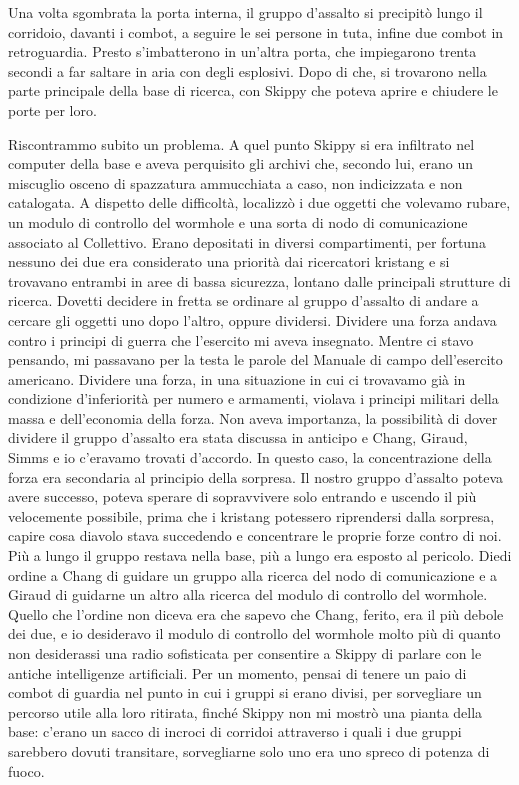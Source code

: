 Una volta sgombrata la porta interna, il gruppo d'assalto si precipitò
lungo il corridoio, davanti i combot, a seguire le sei persone in tuta,
infine due combot in retroguardia. Presto s'imbatterono in un'altra
porta, che impiegarono trenta secondi a far saltare in aria con degli
esplosivi. Dopo di che, si trovarono nella parte principale della base
di ricerca, con Skippy che poteva aprire e chiudere le porte per loro.

Riscontrammo subito un problema. A quel punto Skippy si era infiltrato
nel computer della base e aveva perquisito gli archivi che, secondo lui,
erano un miscuglio osceno di spazzatura ammucchiata a caso, non
indicizzata e non catalogata. A dispetto delle difficoltà, localizzò i
due oggetti che volevamo rubare, un modulo di controllo del wormhole e
una sorta di nodo di comunicazione associato al Collettivo. Erano
depositati in diversi compartimenti, per fortuna nessuno dei due era
considerato una priorità dai ricercatori kristang e si trovavano
entrambi in aree di bassa sicurezza, lontano dalle principali strutture
di ricerca. Dovetti decidere in fretta se ordinare al gruppo d'assalto
di andare a cercare gli oggetti uno dopo l'altro, oppure dividersi.
Dividere una forza andava contro i principi di guerra che l'esercito mi
aveva insegnato. Mentre ci stavo pensando, mi passavano per la testa le
parole del Manuale di campo dell'esercito americano. Dividere una forza,
in una situazione in cui ci trovavamo già in condizione d'inferiorità
per numero e armamenti, violava i principi militari della massa e
dell'economia della forza. Non aveva importanza, la possibilità di dover
dividere il gruppo d'assalto era stata discussa in anticipo e Chang,
Giraud, Simms e io c'eravamo trovati d'accordo. In questo caso, la
concentrazione della forza era secondaria al principio della sorpresa.
Il nostro gruppo d'assalto poteva avere successo, poteva sperare di
sopravvivere solo entrando e uscendo il più velocemente possibile, prima
che i kristang potessero riprendersi dalla sorpresa, capire cosa diavolo
stava succedendo e concentrare le proprie forze contro di noi. Più a
lungo il gruppo restava nella base, più a lungo era esposto al pericolo.
Diedi ordine a Chang di guidare un gruppo alla ricerca del nodo di
comunicazione e a Giraud di guidarne un altro alla ricerca del modulo di
controllo del wormhole. Quello che l'ordine non diceva era che sapevo
che Chang, ferito, era il più debole dei due, e io desideravo il modulo
di controllo del wormhole molto più di quanto non desiderassi una radio
sofisticata per consentire a Skippy di parlare con le antiche
intelligenze artificiali. Per un momento, pensai di tenere un paio di
combot di guardia nel punto in cui i gruppi si erano divisi, per
sorvegliare un percorso utile alla loro ritirata, finché Skippy non mi
mostrò una pianta della base: c'erano un sacco di incroci di corridoi
attraverso i quali i due gruppi sarebbero dovuti transitare,
sorvegliarne solo uno era uno spreco di potenza di fuoco.

